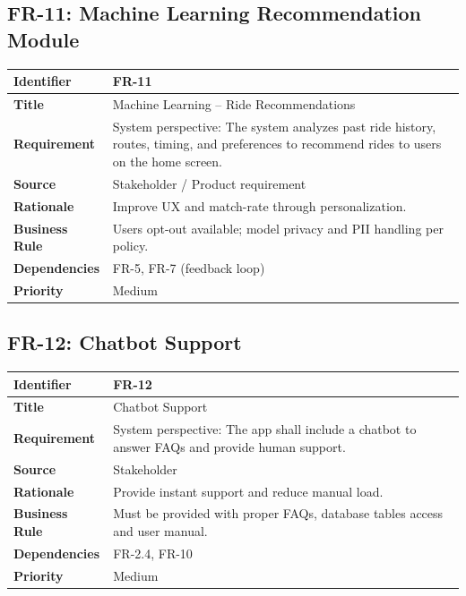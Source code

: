 \subsection{FR-11: Machine Learning Recommendation Module}

\begin{longtable}{|p{3cm}|p{12cm}|}
\hline
\rowcolor{lightgray!30}
\textbf{Identifier} & FR-11 \\
\hline
\textbf{Title} & Machine Learning – Ride Recommendations \\
\hline
\textbf{Requirement} & System perspective: The system analyzes past ride history, routes, timing, and preferences to recommend rides to users on the home screen. \\
\hline
\textbf{Source} & Stakeholder / Product requirement \\
\hline
\textbf{Rationale} & Improve UX and match-rate through personalization. \\
\hline
\textbf{Business Rule} & Users opt-out available; model privacy and PII handling per policy. \\
\hline
\textbf{Dependencies} & FR-5, FR-7 (feedback loop) \\
\hline
\textbf{Priority} & Medium \\
\hline
\end{longtable}

\subsection{FR-12: Chatbot Support}

\begin{longtable}{|p{3cm}|p{12cm}|}
\hline
\rowcolor{lightgray!30}
\textbf{Identifier} & FR-12 \\
\hline
\textbf{Title} & Chatbot Support \\
\hline
\textbf{Requirement} & System perspective: The app shall include a chatbot to answer FAQs and provide human support. \\
\hline
\textbf{Source} & Stakeholder \\
\hline
\textbf{Rationale} & Provide instant support and reduce manual load. \\
\hline
\textbf{Business Rule} & Must be provided with proper FAQs, database tables access and user manual. \\
\hline
\textbf{Dependencies} & FR-2.4, FR-10 \\
\hline
\textbf{Priority} & Medium \\
\hline
\end{longtable}

